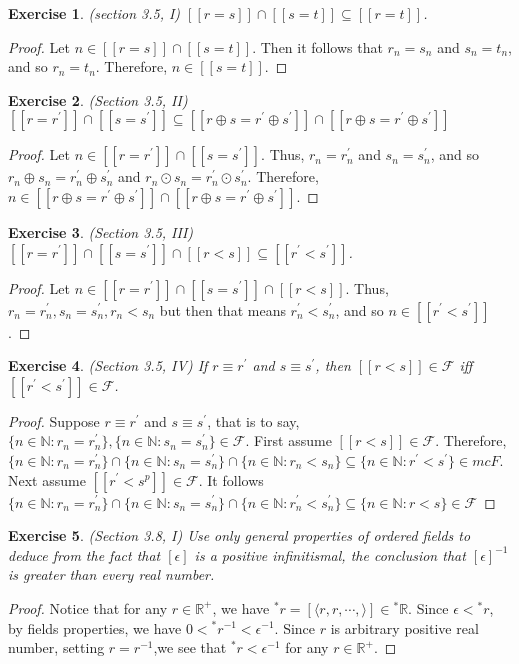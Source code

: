 \documentclass[a4paper, 11pt]{book}
\theoremstyle{plain}
\newtheorem{exercise}{Exercise}[chapter]
\theoremstyle{plain}
\newcommand{\mc}{\mathcal}
\newcommand{\N}{\mathbb{N}}
\newcommand{\R}{\mathbb{R}}
\newcommand{\la}{\langle}
\newcommand{\ra}{\rangle}
\newcommand{\op}{\oplus}
\newcommand{\od}{\odot}
\newcommand{\p}{\prime}
\newcommand{\ep}{\epsilon}
\begin{document}
  \begin{exercise}
    (section 3.5, I)
    $[[r=s]] \cap [[s=t]] \subseteq [[r=t]]$.
  \end{exercise}
  \begin{proof}
    Let $n \in [[r=s]] \cap [[s=t]]$. Then it follows that $r_n=s_n$ and $s_n=t_n$, and so $r_n=t_n$. Therefore, $n \in [[s=t]]$.
  \end{proof}

  \begin{exercise} (Section 3.5, II)
    $[[r=r^\p]] \cap [[s=s^\p]] \subseteq [[r \op s=r^\p \op s^\p]] \cap [[r \op s=r^\p \op s^\p]]$
  \end{exercise}
  \begin{proof}
    Let $n \in [[r=r^\p]] \cap [[s=s^\p]]$. Thus, $r_n=r_n^\p$ and $s_n=s_n^\p$, and so $r_n \op s_n=r_n^\p \op s_n^\p$ and $r_n \od s_n = r_n^\p \od s_n^\p$. Therefore, $n \in [[r \op s=r^\p \op s^\p]] \cap [[r \op s=r^\p \op s^\p]]$.
  \end{proof}
  \begin{exercise}
    (Section 3.5, III)
    $[[r=r^\p]] \cap [[s=s^\p]] \cap [[r<s]] \subseteq [[r^\p<s^\p]]$.
  \end{exercise}
  \begin{proof}
    Let $n \in [[r=r^\p]] \cap [[s=s^\p]] \cap [[r<s]]$. Thus, $r_n=r_n^\p, s_n=s_n^\p, r_n<s_n$ but then that means $r_n^\p<s_n^\p$, and so $ n \in [[r^\p<s^\p]]$.
  \end{proof}
  \begin{exercise} (Section 3.5, IV)
    If $r \equiv r^\p$ and $s \equiv s^\p$, then $[[r<s]] \in \mc{F}$ iff $[[r^\p<s^\p]] \in \mc{F}$.
  \end{exercise}
  \begin{proof}
    Suppose $r \equiv r^\p$ and $s \equiv s^\p$, that is to say, $\{n \in \N: r_n=r_n^\p\}, \{n \in \N: s_n=s_n^\p\} \in \mc{F}$. First assume $[[r<s]] \in \mc{F}$. Therefore, $\{n \in \N: r_n=r_n^\p\} \cap \{n \in \N: s_n=s_n^\p\} \cap \{n \in \N: r_n<s_n\} \subseteq \{n \in \N: r^\p<s^\p \} \in mc{F}$. Next assume $[[r^\p<s^p]] \in \mc{F}$. It follows $\{n \in \N: r_n=r_n^\p\} \cap \{n \in \N: s_n=s_n^\p\} \cap \{n \in \N: r_n^\p<s_n^\p\} \subseteq \{n \in \N: r<s\} \in \mc{F}$
  \end{proof}

  \begin{exercise}
    (Section 3.8, I)
    Use only general properties of ordered fields to deduce from the fact that $[\ep]$ is a positive infinitismal, the conclusion that $[\ep]^{-1}$ is greater than every real number.
  \end{exercise}
  \begin{proof}
    Notice that for any $r \in \R^+$, we have ${}^* r=[\la r,r,\cdots,\ra] \in {}^* \R$. Since $\ep<{}^* r$, by fields properties, we have $0<{}^* r^{-1}<\ep^{-1}$. Since $r$ is arbitrary positive real number, setting $r=r^{-1}$,we see that ${}^* r< \ep^{-1}$ for any $r \in \R^+$. 
  \end{proof}
  
\end{document}

